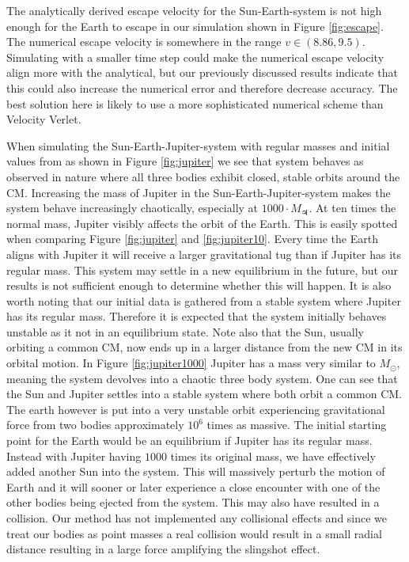 \documentclass[twocolumn]{aastex62}
\begin{document}
The analytically derived escape velocity for the Sun-Earth-system 
is not high enough for the Earth to escape in our simulation shown  
in Figure \ref{fig:escape}. The numerical escape velocity is somewhere 
in the range $v\in(8.86, 9.5)$. Simulating with a smaller time step could 
make the numerical escape velocity align more with the analytical, but 
our previously discussed results indicate that this could also increase 
the numerical error and therefore decrease accuracy. The best solution 
here is likely to use a more sophisticated numerical scheme than 
Velocity Verlet.

When simulating the Sun-Earth-Jupiter-system with regular masses and 
initial values from \cite{nasa:2019} as shown in Figure 
\ref{fig:jupiter} we see that system behaves as observed in nature 
where all three bodies exhibit closed, stable orbits around the CM.
Increasing the mass of Jupiter in the Sun-Earth-Jupiter-system makes the 
system behave increasingly chaotically, especially at 
$1000 \cdot M_\mathrm{\jupiter}$. At ten times the normal mass, 
Jupiter visibly affects the orbit of the Earth. This is easily spotted  
when comparing Figure \ref{fig:jupiter} and \ref{fig:jupiter10}. Every 
time the Earth aligns with Jupiter it will receive a larger gravitational tug than if Jupiter has its regular mass. This system may settle in a new equilibrium in the future, but our results is not sufficient enough to determine whether this will happen. It is also worth noting that our initial data is gathered from a stable system where Jupiter has its regular mass. Therefore it is expected that the system initially behaves unstable as it not in an equilibrium state. Note also that the Sun, usually orbiting a common CM, now ends up in a larger distance from the new CM in its orbital motion. 
In Figure \ref{fig:jupiter1000} Jupiter has a mass very similar to $M_\odot$, meaning the system devolves 
into a chaotic three body system. One can see that the Sun and Jupiter settles into a stable system where both orbit a common CM. The earth however is put into a very unstable orbit experiencing gravitational force from two bodies approximately $10^6$ times as massive. The initial starting point for the Earth would be an equilibrium if Jupiter has its regular mass. Instead with Jupiter having $1000$ times its original mass, we have effectively added another Sun into the system. This will massively perturb the motion of Earth and it will sooner or later experience a close encounter with one of the other bodies being ejected from the system. This may also have resulted in a collision. Our method  has not implemented any collisional effects and since we treat our bodies as point masses a real collision would result in a small radial distance resulting in a large force amplifying the slingshot effect.
\end{document}
